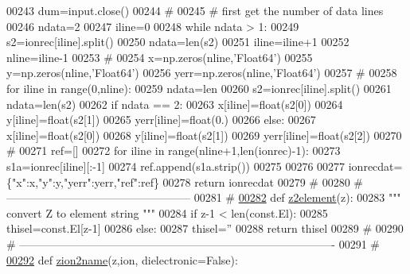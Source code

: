 \begin{DoxyCode}
{{{{00243 \textcolor{stringliteral}{    dum=input.close()}
00244 \textcolor{stringliteral}{    }\textcolor{comment}{#}
00245     \textcolor{comment}{# first get the number of data lines}
00246     ndata=2
00247     iline=0
00248     \textcolor{keywordflow}{while} ndata > 1:
00249         s2=ionrec[iline].split()
00250         ndata=len(s2)
00251         iline=iline+1
00252     nline=iline-1
00253     \textcolor{comment}{#}
00254     x=np.zeros(nline,\textcolor{stringliteral}{'Float64'})
00255     y=np.zeros(nline,\textcolor{stringliteral}{'Float64'})
00256     yerr=np.zeros(nline,\textcolor{stringliteral}{'Float64'})
00257 \textcolor{comment}{#}
00258     \textcolor{keywordflow}{for} iline \textcolor{keywordflow}{in} range(0,nline):
00259         ndata=len
00260         s2=ionrec[iline].split()
00261         ndata=len(s2)
00262         \textcolor{keywordflow}{if} ndata == 2:
00263             x[iline]=float(s2[0])
00264             y[iline]=float(s2[1])
00265             yerr[iline]=float(0.)
00266         \textcolor{keywordflow}{else}:
00267             x[iline]=float(s2[0])
00268             y[iline]=float(s2[1])
00269             yerr[iline]=float(s2[2])
00270     \textcolor{comment}{#}
00271     ref=[]
00272     \textcolor{keywordflow}{for} iline \textcolor{keywordflow}{in} range(nline+1,len(ionrec)-1):
00273         s1a=ionrec[iline][:-1]
00274         ref.append(s1a.strip())
00275 
00276 
00277     ionrecdat=\{\textcolor{stringliteral}{"x"}:x,\textcolor{stringliteral}{"y"}:y,\textcolor{stringliteral}{"yerr"}:yerr,\textcolor{stringliteral}{"ref"}:ref\}
00278     \textcolor{keywordflow}{return} ionrecdat
00279     \textcolor{comment}{#}
00280     \textcolor{comment}{# --------------------------------------------------}
00281     \textcolor{comment}{#}
\hypertarget{__chianti__tools_8py_source_l00282}{}\hyperlink{namespacepyneb_1_1utils_1_1__chianti__tools_a0e092ff402fc0287bcaaed67171934ea}{00282} \textcolor{keyword}{def }\hyperlink{namespacepyneb_1_1utils_1_1__chianti__tools_a0e092ff402fc0287bcaaed67171934ea}{z2element}(z):
00283     \textcolor{stringliteral}{""" convert Z to element string """}
00284     \textcolor{keywordflow}{if} z-1 < len(const.El):
00285         thisel=const.El[z-1]
00286     \textcolor{keywordflow}{else}:
00287         thisel=\textcolor{stringliteral}{''}
00288     \textcolor{keywordflow}{return} thisel
00289     \textcolor{comment}{#}
00290     \textcolor{comment}{# -------------------------------------------------------------------------------------}
00291     \textcolor{comment}{#}
\hypertarget{__chianti__tools_8py_source_l00292}{}\hyperlink{namespacepyneb_1_1utils_1_1__chianti__tools_a7d6debb5f68b52f64c311ca1fe99945c}{00292} \textcolor{keyword}{def }\hyperlink{namespacepyneb_1_1utils_1_1__chianti__tools_a7d6debb5f68b52f64c311ca1fe99945c}{zion2name}(z,ion, dielectronic=False):
}}}}
\end{DoxyCode}
